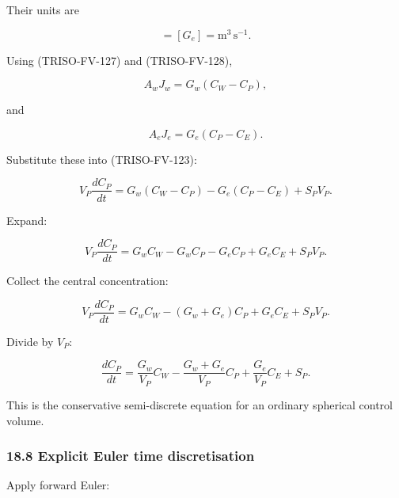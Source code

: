 \documentclass[11pt,a4paper]{article}
\begin{document}
Their units are

\begin{equation}
[G_w]=[G_e]=\mathrm{m^3\,s^{-1}}.
\tag{TRISO-FV-149}
\label{eq:triso-fv-149}
\end{equation}

Using (TRISO-FV-127) and (TRISO-FV-128),

\begin{equation}
A_wJ_w
=
G_w(C_W-C_P),
\tag{TRISO-FV-150}
\label{eq:triso-fv-150}
\end{equation}

and

\begin{equation}
A_eJ_e
=
G_e(C_P-C_E).
\tag{TRISO-FV-151}
\label{eq:triso-fv-151}
\end{equation}

Substitute these into (TRISO-FV-123):

\begin{equation}
V_P\frac{dC_P}{dt}
=
G_w(C_W-C_P)
-
G_e(C_P-C_E)
+
S_PV_P.
\tag{TRISO-FV-152}
\label{eq:triso-fv-152}
\end{equation}

Expand:

\begin{equation}
V_P\frac{dC_P}{dt}
=
G_wC_W
-
G_wC_P
-
G_eC_P
+
G_eC_E
+
S_PV_P.
\tag{TRISO-FV-153}
\label{eq:triso-fv-153}
\end{equation}

Collect the central concentration:

\begin{equation}
\boxed{
V_P\frac{dC_P}{dt}
=
G_wC_W
-
(G_w+G_e)C_P
+
G_eC_E
+
S_PV_P.
}
\tag{TRISO-FV-154}
\label{eq:triso-fv-154}
\end{equation}

Divide by $V_P$:

\begin{equation}
\boxed{
\frac{dC_P}{dt}
=
\frac{G_w}{V_P}C_W
-
\frac{G_w+G_e}{V_P}C_P
+
\frac{G_e}{V_P}C_E
+
S_P.
}
\tag{TRISO-FV-155}
\label{eq:triso-fv-155}
\end{equation}

This is the conservative semi-discrete equation for an ordinary spherical control volume.

\subsubsection*{18.8 Explicit Euler time discretisation}

Apply forward Euler:
\end{document}
